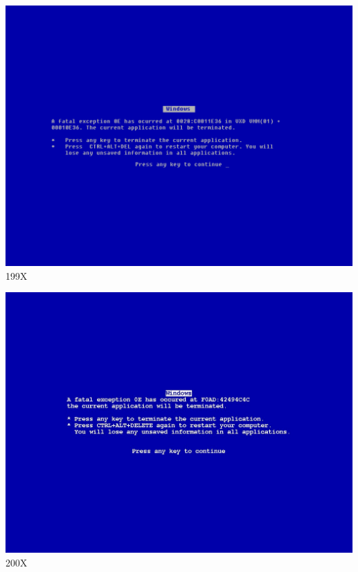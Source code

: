 \documentclass{beamer}
\begin{document}
\begin{frame}
  \begin{center}
    \includegraphics[scale=0.2605]{images/Windows_9x_Blue_Screen_of_Death_recreated_in_Fixedsys.png}\\
    199X
  \end{center}
\end{frame}

\begin{frame}
  \begin{center}
    \includegraphics[scale=0.2715]{images/fix-bsod-win7.jpg}\\
    200X
  \end{center}
\end{frame}
\end{document}
